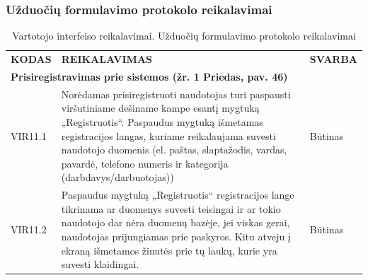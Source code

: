 \documentclass{VUMIFPSkursinis}
\begin{document}
\subsubsection{Užduočių formulavimo protokolo reikalavimai}
\begin{table}[H]
\caption{Vartotojo interfeiso reikalavimai. Užduočių formulavimo protokolo reikalavimai}
\centering
\normalsize
\begin{tabular}{|p{2cm}|p{10cm}|p{3cm}|}
\hline
\rowcolor{gray!30}
\multicolumn{3}{|l|}{\textbf{4.	Užduočių formulavimo protokolo reikalavimai}} \\ \hline
\textbf{KODAS}& \multicolumn{1}{m{10cm}|}{\textbf{REIKALAVIMAS}} & \textbf{SVARBA} \\ \hline
\multicolumn{3}{|l|}{\textbf{Prisiregistravimas prie sistemos (žr. 1 Priedas, pav. 46)}} \\ \hline
VIR11.1 & \multicolumn{1}{m{10cm}|}{Norėdamas prisiregistruoti naudotojas turi paspausti viršutiniame dešiname kampe esantį mygtuką „Registruotis“. Paspaudus mygtuką išmetamas registracijos langas, kuriame reikalaujama suvesti naudotojo duomenis (el. paštas, slaptažodis, vardas, pavardė, telefono numeris ir kategorija (darbdavys/darbuotojas))} & Būtinas \\ \hline
VIR11.2 & \multicolumn{1}{m{10cm}|}{Paspaudus mygtuką „Registruotis“ registracijos lange tikrinama ar duomenys suvesti teisingai ir ar tokio naudotojo dar nėra duomenų bazėje, jei viskas gerai, naudotojas prijungiamas prie paskyros. Kitu atveju į ekraną išmetamos žinutės prie tų laukų, kurie yra suvesti klaidingai.} & Būtinas \\ \hline
\end{tabular}
\end{table}
\end{document}
